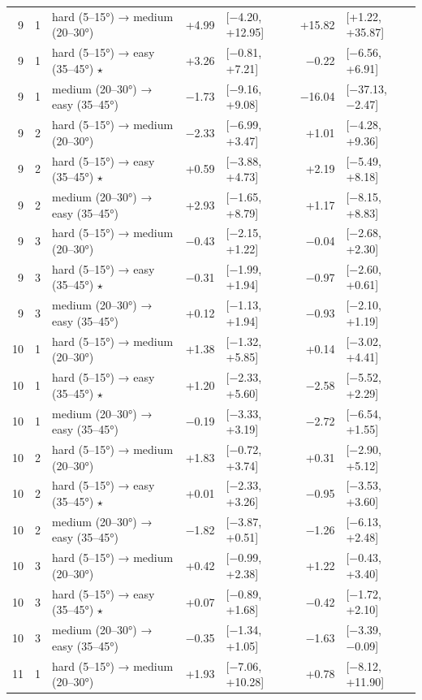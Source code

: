 \begin{table}[htbp]
\begin{tabular}{rllrlrl}
    9 & 1 & hard (5–15°) → medium (20–30°) & +4.99 & [−4.20, +12.95] & +15.82 & [+1.22, +35.87] \\
    9 & 1 & hard (5–15°) → easy (35–45°) $\star$ & +3.26 & [−0.81, +7.21] & −0.22 & [−6.56, +6.91] \\
    9 & 1 & medium (20–30°) → easy (35–45°) & −1.73 & [−9.16, +9.08] & −16.04 & [−37.13, −2.47] \\
    9 & 2 & hard (5–15°) → medium (20–30°) & −2.33 & [−6.99, +3.47] & +1.01 & [−4.28, +9.36] \\
    9 & 2 & hard (5–15°) → easy (35–45°) $\star$ & +0.59 & [−3.88, +4.73] & +2.19 & [−5.49, +8.18] \\
    9 & 2 & medium (20–30°) → easy (35–45°) & +2.93 & [−1.65, +8.79] & +1.17 & [−8.15, +8.83] \\
    9 & 3 & hard (5–15°) → medium (20–30°) & −0.43 & [−2.15, +1.22] & −0.04 & [−2.68, +2.30] \\
    9 & 3 & hard (5–15°) → easy (35–45°) $\star$ & −0.31 & [−1.99, +1.94] & −0.97 & [−2.60, +0.61] \\
    9 & 3 & medium (20–30°) → easy (35–45°) & +0.12 & [−1.13, +1.94] & −0.93 & [−2.10, +1.19] \\
    10 & 1 & hard (5–15°) → medium (20–30°) & +1.38 & [−1.32, +5.85] & +0.14 & [−3.02, +4.41] \\
    10 & 1 & hard (5–15°) → easy (35–45°) $\star$ & +1.20 & [−2.33, +5.60] & −2.58 & [−5.52, +2.29] \\
    10 & 1 & medium (20–30°) → easy (35–45°) & −0.19 & [−3.33, +3.19] & −2.72 & [−6.54, +1.55] \\
    10 & 2 & hard (5–15°) → medium (20–30°) & +1.83 & [−0.72, +3.74] & +0.31 & [−2.90, +5.12] \\
    10 & 2 & hard (5–15°) → easy (35–45°) $\star$ & +0.01 & [−2.33, +3.26] & −0.95 & [−3.53, +3.60] \\
    10 & 2 & medium (20–30°) → easy (35–45°) & −1.82 & [−3.87, +0.51] & −1.26 & [−6.13, +2.48] \\
    10 & 3 & hard (5–15°) → medium (20–30°) & +0.42 & [−0.99, +2.38] & +1.22 & [−0.43, +3.40] \\
    10 & 3 & hard (5–15°) → easy (35–45°) $\star$ & +0.07 & [−0.89, +1.68] & −0.42 & [−1.72, +2.10] \\
    10 & 3 & medium (20–30°) → easy (35–45°) & −0.35 & [−1.34, +1.05] & −1.63 & [−3.39, −0.09] \\
    11 & 1 & hard (5–15°) → medium (20–30°) & +1.93 & [−7.06, +10.28] & +0.78 & [−8.12, +11.90] \\

\end{tabular}
\end{table}
